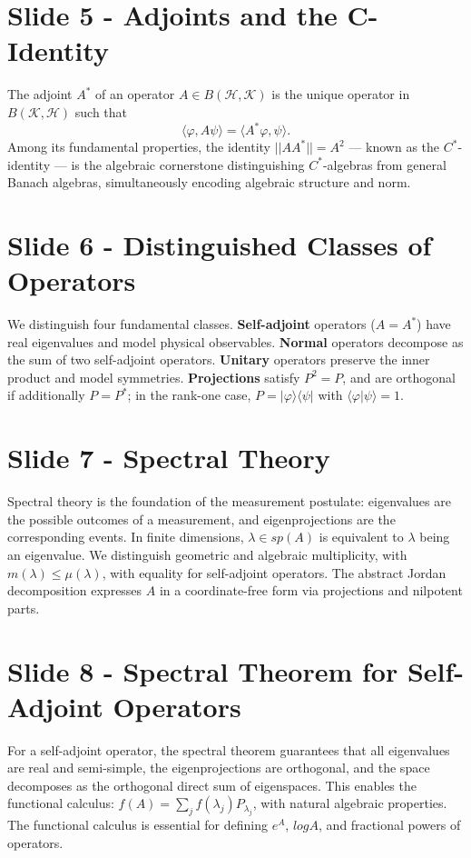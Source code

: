 \documentclass{article}
\begin{document}
\section*{Slide 5 - Adjoints and the C-Identity}
The adjoint $A^*$ of an operator $A \in B(\mathcal{H},\mathcal{K})$ is the unique operator in $B(\mathcal{K},\mathcal{H})$ such that $$\langle \varphi,A\psi \rangle = \langle A^*\varphi,\psi \rangle.$$ Among its fundamental properties, the identity $||AA^*|| = A^2$ — known as the $C^*$-identity — is the algebraic cornerstone distinguishing $C^*$-algebras from general Banach algebras, simultaneously encoding algebraic structure and norm.

\section*{Slide 6 - Distinguished Classes of Operators}
We distinguish four fundamental classes. \textbf{Self-adjoint} operators ($A = A^*$) have real eigenvalues and model physical observables. \textbf{Normal} operators decompose as the sum of two self-adjoint operators. \textbf{Unitary} operators preserve the inner product and model symmetries. \textbf{Projections} satisfy $P^2 = P$, and are orthogonal if additionally $P = P^*$; in the rank-one case, $P = |\varphi\rangle\langle\psi|$ with $\langle\varphi|\psi\rangle=1$.

\section*{Slide 7 - Spectral Theory}
Spectral theory is the foundation of the measurement postulate: eigenvalues are the possible outcomes of a measurement, and eigenprojections are the corresponding events. In finite dimensions, $\lambda \in sp(A)$ is equivalent to $\lambda$ being an eigenvalue. We distinguish geometric and algebraic multiplicity, with $m(\lambda) \leq \mu(\lambda)$, with equality for self-adjoint operators. The abstract Jordan decomposition expresses $A$ in a coordinate-free form via projections and nilpotent parts.

\section*{Slide 8 - Spectral Theorem for Self-Adjoint Operators}
For a self-adjoint operator, the spectral theorem guarantees that all eigenvalues are real and semi-simple, the eigenprojections are orthogonal, and the space decomposes as the orthogonal direct sum of eigenspaces. This enables the functional calculus: $f(A) = \sum_jf(\lambda_j)P_{\lambda_j}$, with natural algebraic properties. The functional calculus is essential for defining $e^A$, $logA$, and fractional powers of operators.
\end{document}
